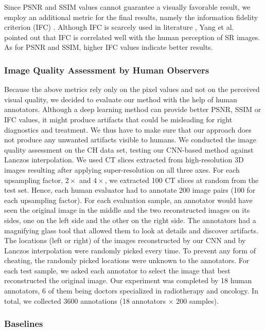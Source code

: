 \documentclass{ieeeaccess}
\begin{document}
Since PSNR and SSIM values cannot guarantee a visually favorable result, we employ an additional metric for the final results, namely the information fidelity criterion (IFC) \cite{Sheikh-TIP-2005}. Although IFC is scarcely used in literature \cite{You-TMI-2019}, Yang et al.~\cite{Yang-ECCV-2014} pointed out that IFC is correlated well with the human perception of SR images. As for PSNR and SSIM, higher IFC values indicate better results.

\subsubsection{Image Quality Assessment by Human Observers}

Because the above metrics rely only on the pixel values and not on the perceived visual quality, we decided to evaluate our method with the help of human annotators. Although a deep learning method can provide better PSNR, SSIM or IFC values, it might produce artifacts that could be misleading for right diagnostics and treatment. We thus have to make sure that our approach does not produce any unwanted artifacts visible to humans. We conducted the image quality assessment on the CH data set, testing our CNN-based method against Lanczos interpolation. We used CT slices extracted from high-resolution 3D images resulting after applying super-resolution on all three axes. For each upsampling factor, $2\times$ and $4\times$, we extracted 100 CT slices at random from the test set. Hence, each human evaluator had to annotate 200 image pairs (100 for each upsampling factor). For each evaluation sample, an annotator would have seen the original image in the middle and the two reconstructed images on its sides, one on the left side and the other on the right side. The annotators had a magnifying glass tool that allowed them to look at details and discover artifacts. The locations (left or right) of the images reconstructed by our CNN and by Lanczos interpolation were randomly picked every time. To prevent any form of cheating, the randomly picked locations were unknown to the annotators. For each test sample, we asked each annotator to select the image that best reconstructed the original image. Our experiment was completed by 18 human annotators, 6 of them being doctors specialized in radiotherapy and oncology. In total, we collected $3600$ annotations (18 annotators $\times$ 200 samples).

\subsubsection{Baselines}
\end{document}
